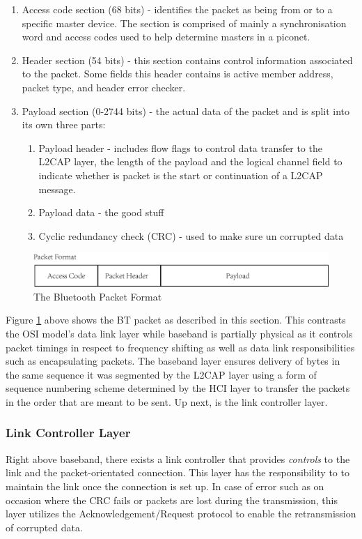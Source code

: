 \documentclass[a4paper,12pt]{article}
\begin{document}
\begin{enumerate}
\item Access code section (68 bits) - identifies the packet as being from or to a specific master device. The section is comprised of mainly a synchronisation word and access codes used to help determine masters in a piconet.
\item Header section (54 bits) - this section contains control information associated to the packet. Some fields this header contains is active member address, packet type, and header error checker.
\item Payload section (0-2744 bits) - the actual data of the packet and is split into its own three parts:
    \begin{enumerate}
    \item Payload header - includes flow flags to control data transfer to the L2CAP layer, the length of the payload and the logical channel field to indicate whether is packet is the start or continuation of a L2CAP message. 
    \item Payload data - the good stuff
    \item Cyclic redundancy check (CRC) - used to make sure un corrupted data
    \end{enumerate}
\end{enumerate}

\begin{figure}[h!]
\centering
\includegraphics[scale=.8]{Figures/Figure3.png}
\caption{The Bluetooth Packet Format}
\label{fig:BTPacket}
\end{figure}

Figure \ref{fig:BTPacket} above shows the BT packet as described in this section. This contrasts the OSI model’s data link layer while baseband is partially physical as it controls packet timings in respect to frequency shifting as well as data link responsibilities such as encapsulating packets. The baseband layer ensures delivery of bytes in the same sequence it was segmented by the L2CAP layer using a form of sequence numbering scheme determined by the HCI layer to transfer the packets in the order that are meant to be sent. Up next, is the link controller layer.

\subsubsection{Link Controller Layer}
Right above baseband, there exists a link controller that provides \textit{controls} to the link and the packet-orientated connection. This layer has the responsibility to to maintain the link once the connection is set up. In case of error such as on occasion where the CRC fails or packets are lost during the transmission, this layer utilizes the Acknowledgement/Request protocol to enable the retransmission of corrupted data. 
\end{document}
